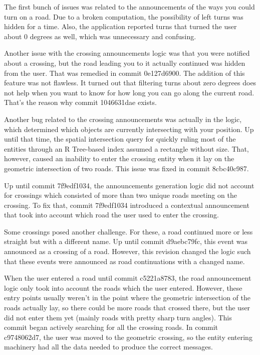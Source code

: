 \documentclass[nolof,digital]{fithesis3}
\begin{document}
The first bunch of issues was related to the announcements of the ways you could turn on a road. Due to a broken computation, the possibility of left turns was hidden for a time. Also, the application reported turns that turned the user about 0 degrees as well, which was unnecessary and confusing.

Another issue with the crossing announcements logic was that you were notified about a crossing, but the road leading you to it actually continued was hidden from the user. That was remedied in commit 0e127d6900. The addition of this feature was not flawless. It turned out that filtering turns about zero degrees does not help when you want to know for how long you can go along the current road. That's the reason why commit 1046631dae exists.

Another bug related to the crossing announcements was actually in the logic, which determined which objects are currently intersecting with your position. Up until that time, the spatial intersection query for quickly ruling most of the entities through an R Tree-based index assumed a rectangle without size. That, however, caused an inability to enter the crossing entity when it lay on the geometric intersection of two roads. This issue was fixed in commit 8cbc40c987.

Up until commit 7f9edf1034, the announcements generation logic did not account for crossings which consisted of more than two unique roads meeting on the crossing. To fix that, commit 7f9edf1034 introduced a contextual announcement that took into account which road the user used to enter the crossing.

Some crossings posed another challenge. For these, a road continued more or less straight but with a different name. Up until commit d9aebc79fc, this event was announced as a crossing of a road. However, this revision changed the logic such that these events were announced as road continuations with a changed name.

When the user entered a road until commit c5221a8783, the road announcement logic only took into account the roads which the user entered. However, these entry points usually weren't in the point where the geometric intersection of the roads actually lay, so there could be more roads that crossed there, but the user did not enter them yet (mainly roads with pretty sharp turn angles). This commit began actively searching for all the crossing roads. In commit c9748062d7, the user was moved to the geometric crossing, so the entity entering machinery had all the data needed to produce the correct messages.
\end{document}
